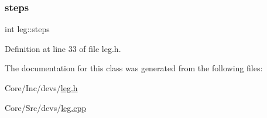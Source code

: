 \mbox{\label{classleg_a8056ae3fb3e8df59e560316932a2be0d}} 
\subsubsection{\texorpdfstring{steps}{steps}}
{\footnotesize\ttfamily int leg\+::steps}



Definition at line 33 of file leg.\+h.



The documentation for this class was generated from the following files\+:\begin{DoxyCompactItemize}
\item 
Core/\+Inc/devs/\mbox{\hyperlink{leg_8h}{leg.\+h}}\item 
Core/\+Src/devs/\mbox{\hyperlink{leg_8cpp}{leg.\+cpp}}\end{DoxyCompactItemize}
